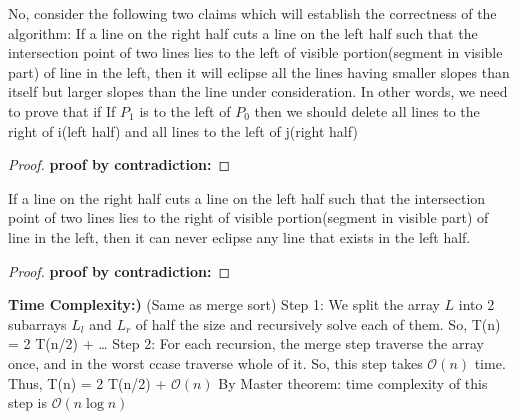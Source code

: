 \documentclass[11pt]{article}
\renewcommand{\O}{\mathcal{O}}
\begin{document}
No, consider the following two claims which will establish the correctness of the algorithm: \newline
{} If a line on the right half cuts a line on the left half such that the intersection point of two lines
lies to the left of visible portion(segment in visible part) of line in the left, then it will eclipse all the lines 
having smaller slopes than itself but larger slopes than the line under consideration. \newline
In other words, we need to prove that if If $P_1$ is to the left of $P_0$ then we should delete all lines
to the right of i(left half) and all lines to the left of j(right half)
\begin{proof}
{\bf proof by contradiction:} 
\end{proof}
 If a line on the right half cuts a line on the left half such that the intersection point of two lines
lies to the right of visible portion(segment in visible part) of line in the left, then it can never eclipse any line that 
exists in the left half. \newline
\begin{proof}
{\bf proof by contradiction:} 
\end{proof}

{\bf Time Complexity:)} (Same as merge sort) \newline
Step 1: We split the array $L$ into 2 subarrays $L_l$ and $L_r$ of half the size and recursively solve each of them. 
So, T(n) = 2 T(n/2) + \dots \newline
Step 2: For each recursion, the merge step traverse the array once, and in the worst ccase traverse whole of it. \newline
So, this step takes $\O(n)$ time. \newline
Thus, T(n) = 2 T(n/2) + $\O(n)$ \newline
By Master theorem: time complexity of this step is $\O(n\log n)$ \newline
\end{document}
